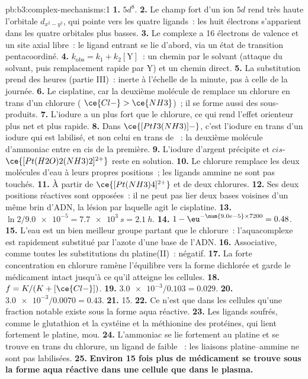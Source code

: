 \begin{solution}{pb:b3:complex-mechanisms:1}
\textbf{1.} $5d^8$.
\textbf{2.} Le champ fort d'un ion $5d$ rend très haute l'orbitale $d_{x^2-y^2}$, qui pointe vers les quatre
ligands~: les huit électrons s'apparient dans les quatre orbitales plus basses.
\textbf{3.} Le complexe a 16 électrons de valence et un site axial libre~:
le ligand entrant se lie d'abord, via un état de transition pentacoordiné.
\textbf{4.} $k_{\mathrm{obs}} = k_1 + k_2[\mathrm Y]$~: un chemin par le solvant (attaque du solvant, puis remplacement rapide par Y)
et un chemin direct.
\textbf{5.} La substitution prend des heures (partie III)~: inerte à
l'échelle de la minute, pas à celle de la journée.
\textbf{6.} Le cisplatine, car la deuxième molécule de  remplace un chlorure en trans d'un chlorure
( $\ce{Cl-} > \ce{NH3}$)~; il se forme aussi des sous-produits.
\textbf{7.} L'iodure a un  plus fort que le chlorure, ce qui rend
l'effet orienteur plus net et plus rapide.
\textbf{8.} Dans $\ce{[PtI3(NH3)]-}$, c'est l'iodure en trans d'un iodure qui est labilisé, et non celui en trans de
~: la deuxième molécule d'ammoniac entre en cis de la première.
\textbf{9.} L'iodure d'argent précipite et $cis$-$\ce{[Pt(H2O)2(NH3)2]^{2+}}$ reste en solution.
\textbf{10.} Le chlorure remplace les deux molécules d'eau à leurs propres
positions~; les ligands ammine ne sont pas touchés.
\textbf{11.} À partir de $\ce{[Pt(NH3)4]^{2+}}$ et de deux chlorures.
\textbf{12.} Ses deux positions réactives sont opposées~: il ne peut pas
lier deux bases voisines d'un même brin d'ADN, la lésion par laquelle agit
le cisplatine.
\textbf{13.} $\ln2/\num{9.0e-5} = \qty{7.7e3}{s} = \qty{2.1}{h}$.
\textbf{14.} $1 - \eu^{-\num{9.0e-5} \times 7200} = 0.48$.
\textbf{15.} L'eau est un bien meilleur groupe partant que le chlorure~:
l'aquacomplexe est rapidement substitué par l'azote d'une base de l'ADN.
\textbf{16.} Associative, comme toutes les substitutions du platine(II)~:
 négatif.
\textbf{17.} La forte concentration en chlorure ramène l'équilibre vers la
forme dichlorée et garde le médicament intact jusqu'à ce qu'il atteigne les
cellules.
\textbf{18.} $f = K/(K + [\ce{Cl-}])$.
\textbf{19.} $\num{3.0e-3}/0.103 = 0.029$.
\textbf{20.} $\num{3.0e-3}/0.0070 = 0.43$.
\textbf{21.} 15.
\textbf{22.} Ce n'est que dans les cellules qu'une fraction notable existe
sous la forme aqua réactive.
\textbf{23.} Les ligands soufrés, comme le glutathion et la cystéine et la
méthionine des protéines, qui lient fortement le platine, mou.
\textbf{24.} L'ammoniac se lie fortement au platine et se trouve en trans
du chlorure, un ligand de faible ~: les liaisons platine--ammine
ne sont pas labilisées.
\textbf{25.} \textbf{Environ 15 fois plus de médicament se trouve sous la
forme aqua réactive dans une cellule que dans le plasma.}
\end{solution}
